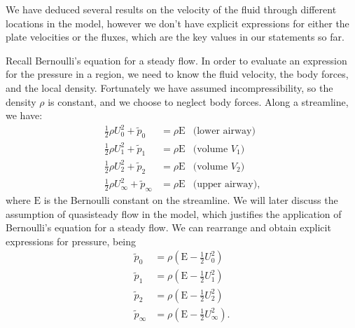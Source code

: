

We have deduced several results on the velocity of the fluid through different locations in the model,
however we don't have explicit expressions for either the plate velocities or the fluxes,
which are the key values in our statements so far.

Recall Bernoulli's equation for a steady flow.
In order to evaluate an expression for the pressure in a region,
we need to know the fluid velocity, the body forces, and the local density.
Fortunately we have assumed incompressibility, so the density $\rho$ is constant,
and we choose to neglect body forces.
Along a streamline, we have:
\begin{equation}
    \begin{aligned}
        \frac{1}{2}\rho U_0^2 + \tilde{p}_0 &= \rho\mathrm{E} &\text{(lower airway)}\\
        \frac{1}{2}\rho U_1^2 + \tilde{p}_1 &= \rho\mathrm{E} &\text{(volume $V_1$)}  \\
        \frac{1}{2}\rho U_2^2 + \tilde{p}_2 &= \rho\mathrm{E} &\text{(volume $V_2$)}  \\
        \frac{1}{2}\rho U_\infty^2 + \tilde{p}_\infty &= \rho\mathrm{E} &\text{(upper airway)},
    \end{aligned}
\end{equation}
where $\mathrm{E}$ is the Bernoulli constant on the streamline.
We will later discuss the assumption of quasisteady flow in the model,
which justifies the application of Bernoulli's equation for a steady flow.
We can rearrange and obtain explicit expressions for pressure, being
\begin{equation}
    \begin{aligned}
        \tilde{p}_0 &= \rho\left(\mathrm{E} - \frac{1}{2}U_0^2\right) \\
        \tilde{p}_1 &= \rho\left(\mathrm{E} - \frac{1}{2}U_1^2\right) \\
        \tilde{p}_2 &= \rho\left(\mathrm{E} - \frac{1}{2}U_2^2\right) \\
        \tilde{p}_\infty &= \rho\left(\mathrm{E} - \frac{1}{2}U_\infty^2\right).
    \end{aligned}
\end{equation}
